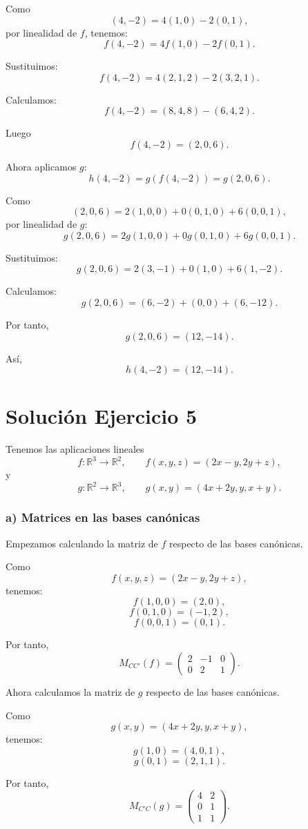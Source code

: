 \documentclass[12pt]{article}
\begin{document}
Como
\[
(4,-2)=4(1,0)-2(0,1),
\]
por linealidad de \(f\), tenemos:
\[
f(4,-2)=4f(1,0)-2f(0,1).
\]

Sustituimos:
\[
f(4,-2)=4(2,1,2)-2(3,2,1).
\]

Calculamos:
\[
f(4,-2)=(8,4,8)-(6,4,2).
\]

Luego
\[
f(4,-2)=(2,0,6).
\]

Ahora aplicamos \(g\):
\[
h(4,-2)=g(f(4,-2))=g(2,0,6).
\]

Como
\[
(2,0,6)=2(1,0,0)+0(0,1,0)+6(0,0,1),
\]
por linealidad de \(g\):
\[
g(2,0,6)=2g(1,0,0)+0g(0,1,0)+6g(0,0,1).
\]

Sustituimos:
\[
g(2,0,6)=2(3,-1)+0(1,0)+6(1,-2).
\]

Calculamos:
\[
g(2,0,6)=(6,-2)+(0,0)+(6,-12).
\]

Por tanto,
\[
g(2,0,6)=(12,-14).
\]

Así,
\[
\boxed{h(4,-2)=(12,-14).}
\]

\section*{Solución Ejercicio 5}

Tenemos las aplicaciones lineales
\[
f:\mathbb{R}^3\longrightarrow \mathbb{R}^2,
\qquad
f(x,y,z)=(2x-y,2y+z),
\]
y
\[
g:\mathbb{R}^2\longrightarrow \mathbb{R}^3,
\qquad
g(x,y)=(4x+2y,y,x+y).
\]

\subsubsection*{a) Matrices en las bases canónicas}

Empezamos calculando la matriz de \(f\) respecto de las bases canónicas.

Como
\[
f(x,y,z)=(2x-y,2y+z),
\]
tenemos:
\[
f(1,0,0)=(2,0),
\]
\[
f(0,1,0)=(-1,2),
\]
\[
f(0,0,1)=(0,1).
\]

Por tanto,
\[
M_{CC'}(f)=
\begin{pmatrix}
2&-1&0\\
0&2&1
\end{pmatrix}.
\]

Ahora calculamos la matriz de \(g\) respecto de las bases canónicas.

Como
\[
g(x,y)=(4x+2y,y,x+y),
\]
tenemos:
\[
g(1,0)=(4,0,1),
\]
\[
g(0,1)=(2,1,1).
\]

Por tanto,
\[
M_{C'C}(g)=
\begin{pmatrix}
4&2\\
0&1\\
1&1
\end{pmatrix}.
\]
\end{document}
